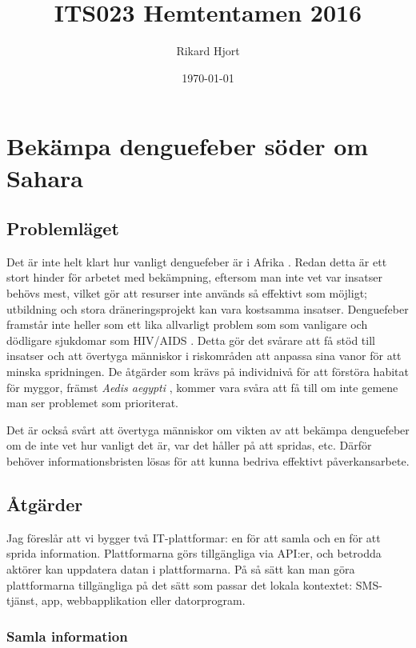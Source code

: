 \documentclass{article}
\title{ITS023 Hemtentamen 2016}
\date{\today}
\author{Rikard Hjort}
\begin{document}
\maketitle

\section{Bekämpa denguefeber söder om Sahara}

\subsection{Problemläget}

Det är inte helt klart hur vanligt denguefeber är i Afrika . Redan detta är ett stort hinder för arbetet med bekämpning, eftersom man inte vet var insatser behövs mest, vilket gör att resurser inte används så effektivt som möjligt; utbildning och stora dräneringsprojekt kan vara kostsamma insatser. Denguefeber framstår inte heller som ett lika allvarligt problem som som vanligare och dödligare sjukdomar som HIV/AIDS . Detta gör det svårare att få stöd till insatser och att övertyga människor i riskområden att anpassa sina vanor för att minska spridningen. De åtgärder som krävs på individnivå för att förstöra habitat för myggor, främst \emph{Aedis aegypti} , kommer vara svåra att få till om inte gemene man ser problemet som prioriterat.

Det är också svårt att övertyga människor om vikten av att bekämpa denguefeber om de inte vet hur vanligt det är, var det håller på att spridas, etc. Därför behöver informationsbristen lösas för att kunna bedriva effektivt påverkansarbete.

\subsection{Åtgärder}

Jag föreslår att vi bygger två IT-plattformar: en för att samla och en för att sprida information. Plattformarna görs tillgängliga via API:er, och betrodda aktörer kan uppdatera datan i plattformarna. På så sätt kan man göra plattformarna tillgängliga på det sätt som passar det lokala kontextet: SMS-tjänst, app, webbapplikation eller datorprogram.

\subsubsection{Samla information}
\end{document}
